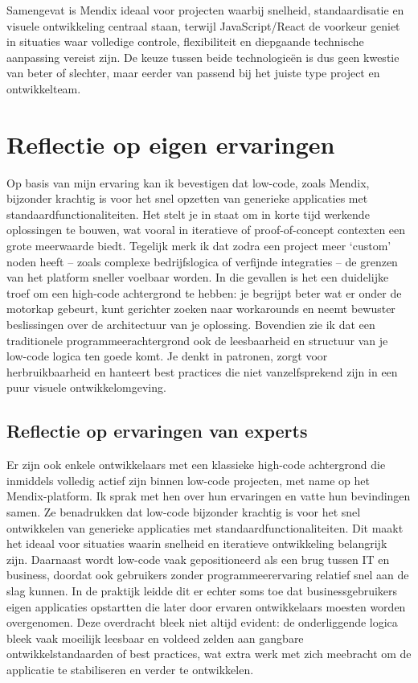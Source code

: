 Samengevat is Mendix ideaal voor projecten waarbij snelheid, standaardisatie en visuele ontwikkeling centraal staan, terwijl JavaScript/React de voorkeur geniet in situaties waar volledige controle, flexibiliteit en diepgaande technische aanpassing vereist zijn. De keuze tussen beide technologieën is dus geen kwestie van beter of slechter, maar eerder van passend bij het juiste type project en ontwikkelteam.


\section{Reflectie op eigen ervaringen}
Op basis van mijn ervaring kan ik bevestigen dat low-code, zoals Mendix, bijzonder krachtig is voor het snel opzetten van generieke applicaties met standaardfunctionaliteiten. Het stelt je in staat om in korte tijd werkende oplossingen te bouwen, wat vooral in iteratieve of proof-of-concept contexten een grote meerwaarde biedt. Tegelijk merk ik dat zodra een project meer ‘custom’ noden heeft – zoals complexe bedrijfslogica of verfijnde integraties – de grenzen van het platform sneller voelbaar worden. In die gevallen is het een duidelijke troef om een high-code achtergrond te hebben: je begrijpt beter wat er onder de motorkap gebeurt, kunt gerichter zoeken naar workarounds en neemt bewuster beslissingen over de architectuur van je oplossing. Bovendien zie ik dat een traditionele programmeerachtergrond ook de leesbaarheid en structuur van je low-code logica ten goede komt. Je denkt in patronen, zorgt voor herbruikbaarheid en hanteert best practices die niet vanzelfsprekend zijn in een puur visuele ontwikkelomgeving.

\subsection{Reflectie op ervaringen van experts}
Er zijn ook enkele ontwikkelaars met een klassieke high-code achtergrond die inmiddels volledig actief zijn binnen low-code projecten, met name op het Mendix-platform. Ik sprak met hen over hun ervaringen en vatte hun bevindingen samen. 
Ze benadrukken dat low-code bijzonder krachtig is voor het snel ontwikkelen van generieke applicaties met standaardfunctionaliteiten. Dit maakt het ideaal voor situaties waarin snelheid en iteratieve ontwikkeling belangrijk zijn. Daarnaast wordt low-code vaak gepositioneerd als een brug tussen IT en business, doordat ook gebruikers zonder programmeerervaring relatief snel aan de slag kunnen. In de praktijk leidde dit er echter soms toe dat businessgebruikers eigen applicaties opstartten die later door ervaren ontwikkelaars moesten worden overgenomen. Deze overdracht bleek niet altijd evident: de onderliggende logica bleek vaak moeilijk leesbaar en voldeed zelden aan gangbare ontwikkelstandaarden of best practices, wat extra werk met zich meebracht om de applicatie te stabiliseren en verder te ontwikkelen.

